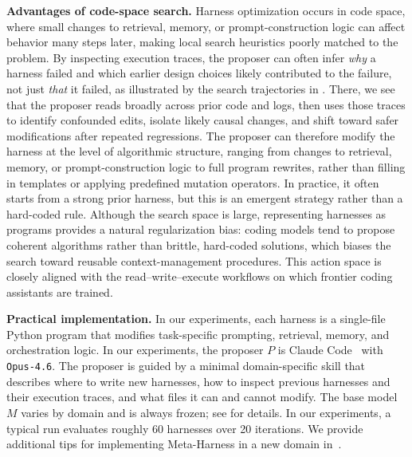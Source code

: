 \textbf{Advantages of code-space search.}
Harness optimization occurs in code space, where small changes to retrieval, memory, or prompt-construction logic can affect behavior many steps later, making local search heuristics poorly matched to the problem.
By inspecting execution traces, the proposer can often infer \emph{why} a harness failed and which earlier design choices likely contributed to the failure, not just \emph{that} it failed, as illustrated by the search trajectories in . There, we see that the proposer reads broadly across prior code and logs, then uses those traces to identify confounded edits, isolate likely causal changes, and shift toward safer modifications after repeated regressions.
The proposer can therefore modify the harness at the level of algorithmic structure, ranging from changes to retrieval, memory, or prompt-construction logic to full program rewrites, rather than filling in templates or applying predefined mutation operators.
In practice, it often starts from a strong prior harness, but this is an emergent strategy rather than a hard-coded rule.
Although the search space is large, representing harnesses as programs provides a natural regularization bias: coding models tend to propose coherent algorithms rather than brittle, hard-coded solutions, which biases the search toward reusable context-management procedures.
This action space is closely aligned with the read--write--execute workflows on which frontier coding assistants are trained.

\textbf{Practical implementation.}
In our experiments, each harness is a single-file Python program that modifies task-specific prompting, retrieval, memory, and orchestration logic.
In our experiments, the proposer $P$ is Claude Code~\citep{anthropic2025claudecode} with \texttt{Opus-4.6}.
The proposer is guided by a minimal domain-specific skill that describes where to write new harnesses, how to inspect previous harnesses and their execution traces, and what files it can and cannot modify.
The base model $M$ varies by domain and is always frozen; see  for details.
In our experiments, a typical run evaluates roughly 60 harnesses over 20 iterations.
We provide additional tips for implementing Meta-Harness in a new domain in~.

